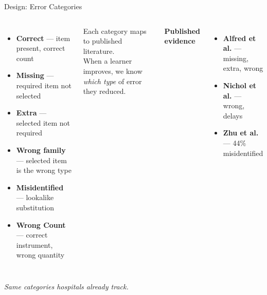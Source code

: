 \documentclass[10pt,aspectratio=169]{beamer}
\newcommand{\takeaway}[1]{%
  \vspace{0.25cm}
  \begin{center}\textit{\small #1}\end{center}
}
\begin{document}
\begin{frame}{Design: Error Categories}
  \begin{columns}[T]
    \begin{itemize}
      \item[\textbf{--}] \textbf{Correct} --- item present, correct count

      \item[\textbf{--}] \textbf{Missing} --- required item not selected

      \item[\textbf{--}] \textbf{Extra} --- selected item not required

      \item[\textbf{--}] \textbf{Wrong family} --- selected item is the wrong type

      \item[\textbf{--}] \textbf{Misidentified} --- lookalike substitution

      \item[\textbf{--}] \textbf{Wrong Count} --- correct instrument, wrong quantity
    \end{itemize}
    \vspace{0.3cm}
    \begin{block}{}
      \centering
      \footnotesize Each category maps to published literature.\\
      \footnotesize When a learner improves, we know \emph{which type} of error they reduced.
    \end{block}
    \centering
    \textbf{Published evidence}
    \vspace{0.2cm}
    \begin{itemize}
      \item \textbf{Alfred et al.} --- missing, extra, wrong
      \item \textbf{Nichol et al.} --- wrong, delays
      \item \textbf{Zhu et al.} --- 44\% misidentified
    \end{itemize}
  \end{columns}
  \takeaway{Same categories hospitals already track.}
\end{frame}
\end{document}
